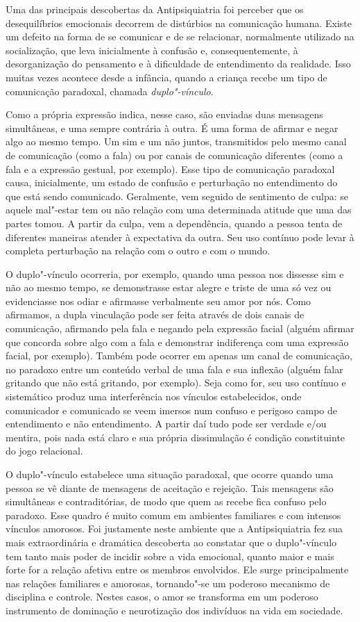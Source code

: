 Uma das principais descobertas da Antipsiquiatria foi perceber que os
desequilíbrios emocionais decorrem de distúrbios na comunicação humana.
Existe um defeito na forma de se comunicar e de se relacionar,
normalmente utilizado na socialização, que leva inicialmente à confusão
e, consequentemente, à desorganização do pensamento e à dificuldade de
entendimento da realidade. Isso muitas vezes acontece desde a infância,
quando a criança recebe um tipo de comunicação paradoxal, chamada
\emph{duplo"-vínculo}.

Como a própria expressão indica, nesse caso, são enviadas duas mensagens
simultâneas, e uma sempre contrária à outra. É uma forma de afirmar e
negar algo ao mesmo tempo. Um sim e um não juntos, transmitidos pelo
mesmo canal de comunicação (como a fala) ou por canais de comunicação
diferentes (como a fala e a expressão gestual, por exemplo). Esse tipo
de comunicação paradoxal causa, inicialmente, um estado de confusão e
perturbação no entendimento do que está sendo comunicado. Geralmente,
vem seguido de sentimento de culpa: se aquele mal"-estar tem ou não
relação com uma determinada atitude que uma das partes tomou. A partir
da culpa, vem a dependência, quando a pessoa tenta de diferentes
maneiras atender à expectativa da outra. Seu uso contínuo pode levar à
completa perturbação na relação com o outro e com o mundo.

O duplo"-vínculo ocorreria, por exemplo, quando uma pessoa nos dissesse
sim e não ao mesmo tempo, se demonstrasse estar alegre e triste de uma
só vez ou evidenciasse nos odiar e afirmasse verbalmente seu amor por
nós. Como afirmamos, a dupla vinculação pode ser feita através de dois
canais de comunicação, afirmando pela fala e negando pela expressão
facial (alguém afirmar que concorda sobre algo com a fala e demonstrar
indiferença com uma expressão facial, por exemplo). Também pode ocorrer
em apenas um canal de comunicação, no paradoxo entre um conteúdo verbal
de uma fala e sua inflexão (alguém falar gritando que não está gritando,
por exemplo). Seja como for, seu uso contínuo e sistemático produz uma
interferência nos vínculos estabelecidos, onde comunicador e comunicado
se veem imersos num confuso e perigoso campo de entendimento e
não entendimento. A partir daí tudo pode ser verdade e/ou mentira, pois
nada está claro e sua própria dissimulação é condição constituinte do
jogo relacional.

O duplo"-vínculo estabelece uma situação paradoxal, que ocorre quando uma
pessoa se vê diante de mensagens de aceitação e rejeição. Tais mensagens
são simultâneas e contraditórias, de modo que quem as recebe fica
confuso pelo paradoxo. Esse quadro é muito comum em ambientes familiares
e com intensos vínculos amorosos. Foi justamente neste ambiente que a
Antipsiquiatria fez sua mais extraordinária e dramática descoberta ao
constatar que o duplo"-vínculo tem tanto mais poder de incidir sobre a
vida emocional, quanto maior e mais forte for a relação afetiva entre os
membros envolvidos. Ele surge principalmente nas relações familiares e
amorosas, tornando"-se um poderoso mecanismo de disciplina e controle.
Nestes casos, o amor se transforma em um poderoso instrumento de
dominação e neurotização dos indivíduos na vida em sociedade.

